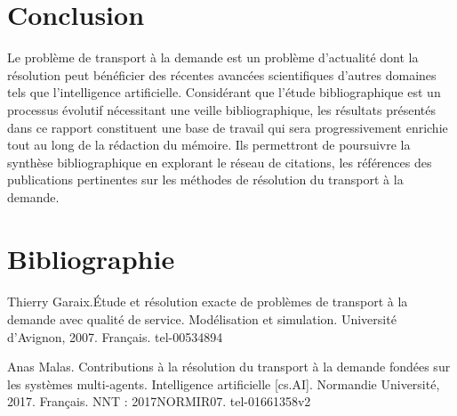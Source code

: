 \documentclass{article}
\begin{document}
\section{Conclusion}

Le problème de transport à la demande est un problème d'actualité dont la résolution peut bénéficier des récentes avancées scientifiques d'autres domaines tels que l'intelligence artificielle. Considérant que l'étude bibliographique est un processus évolutif nécessitant une veille bibliographique, les résultats présentés dans ce rapport constituent une base de travail qui sera progressivement enrichie tout au long de la rédaction du mémoire. Ils permettront de poursuivre la synthèse bibliographique en explorant le réseau de citations, les références des publications pertinentes sur les méthodes de résolution du transport à la demande.


\section{Bibliographie}

\paragraph{}
Thierry Garaix.Étude et résolution exacte de problèmes de transport à la demande avec qualité de service. Modélisation et simulation. Université d’Avignon, 2007. Français. tel-00534894

Anas Malas. Contributions à la résolution du transport à la demande fondées sur les systèmes multi-agents. Intelligence artificielle [cs.AI]. Normandie Université, 2017. Français. NNT : 2017NORMIR07. tel-01661358v2
\end{document}
